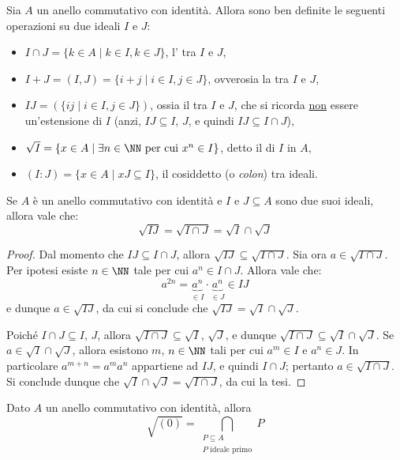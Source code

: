 \documentclass[11pt]{scrartcl}
\begin{document}
	Sia $A$ un anello commutativo con identità. Allora sono ben definite le
	seguenti operazioni su due ideali $I$ e $J$:
	\begin{itemize}
		\item $I\cap J = \{k \in A \mid k \in I, k \in J\}$, l' tra
		$I$ e $J$,
		\item $I + J = (I, J) = \{i + j \mid i \in I, j \in J\}$, ovverosia la  tra $I$ e $J$,
		\item $IJ = (\{ij\mid i \in I, j \in J\})$, ossia il  tra $I$ e $J$, che si ricorda \underline{non} essere
		un'estensione di $I$ (anzi, $IJ \subseteq I$, $J$, e quindi $IJ \subseteq I \cap J$),
		\item $\sqrt{I} = \{x \in A \mid \exists n \in \NN \text{ per cui } x^n \in I\}$,
		detto il  di $I$ in $A$,
		\item $(I : J) = \{x \in A \mid xJ \subseteq I\}$, il cosiddetto  (o \textit{colon}) tra ideali.
	\end{itemize}
	
	\begin{proposition}
		Se $A$ è un anello commutativo con identità e $I$ e $J \subseteq A$ sono due suoi ideali,
		allora vale che:
		\[
		\sqrt{IJ} = \sqrt{I\cap J} = \sqrt{I}\cap \sqrt{J}
		\]
	\end{proposition}
	
	\begin{proof}
		Dal momento che $IJ \subseteq I \cap J$, allora $\sqrt{IJ} \subseteq \sqrt{I \cap J}$. Sia ora $a \in \sqrt{I \cap J}$. Per ipotesi esiste $n \in \NN$ tale
		per cui $a^n \in I \cap J$. Allora vale che:
		\[
		a^{2n} = \underbrace{a^n}_{\in I} \cdot \underbrace{a^n}_{\in J}
		\in IJ
		\]
		e dunque $a \in \sqrt{IJ}$, da cui si conclude che $\sqrt{IJ} = \sqrt{I} \cap \sqrt{J}$. \medskip
		
		
		Poiché $I \cap J \subseteq I$, $J$, allora $\sqrt{I \cap J} \subseteq \sqrt{I}$,
		$\sqrt{J}$, e dunque $\sqrt{I \cap J} \subseteq \sqrt{I} \cap \sqrt{J}$. Se
		$a \in \sqrt{I} \cap \sqrt{J}$, allora esistono $m$, $n \in \NN$ tali per
		cui $a^m \in I$ e $a^n \in J$. In particolare $a^{m+n} = a^m a^n$ appartiene
		ad $IJ$, e quindi $I \cap J$; pertanto $a \in \sqrt{I \cap J}$. Si conclude
		dunque che $\sqrt{I} \cap \sqrt{J} = \sqrt{I \cap J}$, da cui la tesi.
	\end{proof}
	
	\begin{proposition}
		\label{prop2.9}
		Dato $A$ un anello commutativo con identità, allora
		\[
		\sqrt{(0)} = \bigcap_{\substack{P\subseteq A\\ P \text{ ideale primo}}}P
		\]
	\end{proposition}
	
\end{document}
